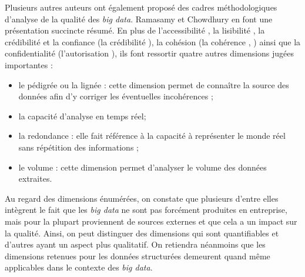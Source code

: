 Plusieurs autres auteurs ont \'egalement propos\'e des cadres m\'ethodologiques d'analyse de la qualit\'e des \textit{big data}. Ramasamy et Chowdhury \cite{articleRamasamyChowdhury2020} en font une pr\'esentation succincte r\'esum\'e. En plus de l'accessibilit\'e \cite{Cai_Zhu_2015}, la lisibilit\'e \cite{Cai_Zhu_2015}, la cr\'edibilit\'e et la confiance \cite{articleRamasamyChowdhury2020} (la cr\'edibilit\'e \cite{Cai_Zhu_2015}), la coh\'esion \cite{articleRamasamyChowdhury2020} (la coh\'erence \cite{dama}, \cite{Cai_Zhu_2015}) ainsi que la confidentialit\'e \cite{articleRamasamyChowdhury2020} (l'autorisation \cite{Cai_Zhu_2015}), ils font ressortir quatre autres dimensions jug\'ees importantes : 

\begin{itemize}[parsep=0cm,itemsep=0cm]
\item le p\'edigr\'ee ou la lignée : cette dimension permet de connaître la source des donn\'ees afin d'y corriger les éventuelles incoh\'erences ;
\item la capacit\'e d'analyse en temps r\'eel;
\item la redondance :  elle fait r\'ef\'erence \`a la capacit\'e \`a repr\'esenter le monde r\'eel sans r\'ep\'etition des informations ;
\item le volume : cette dimension permet d'analyser le volume des donn\'ees extraites.

\end{itemize}
\vspace {0.5cm}

Au regard des dimensions \'enum\'er\'ees, on constate que plusieurs d'entre elles int\`egrent le fait que les \textit{big data} ne sont pas forc\'ement produites en entreprise, mais pour la plupart proviennent de sources externes et que cela a un impact sur la qualit\'e. Ainsi, on peut distinguer des dimensions qui sont quantifiables et d'autres ayant un aspect plus qualitatif. On retiendra néanmoins que les dimensions retenues pour les donn\'ees structur\'ees demeurent quand m\^eme applicables dans le contexte des \textit{big data}.


